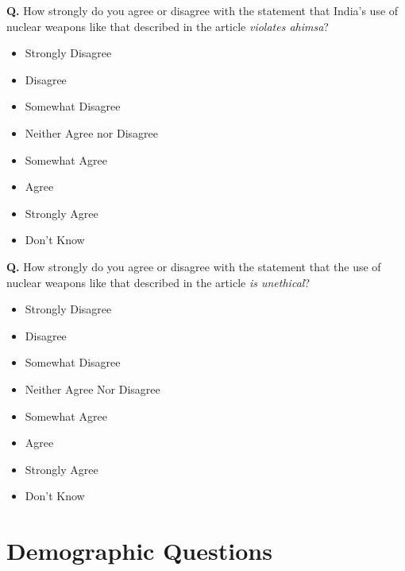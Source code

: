 \documentclass[12pt]{article}
\newcounter{qnum}
\newcommand{\question}[1]{%
  \stepcounter{qnum}%
  \noindent\textbf{Q\thequnum.} #1\par\medskip
}
\newcommand{\likert}[1]{%
  \begin{itemize}[leftmargin=2em, itemsep=2pt, topsep=2pt]
    #1
  \end{itemize}\medskip
}
\begin{document}
\question{How strongly do you agree or disagree with the statement that India's use of nuclear weapons like that described in the article \textit{violates ahimsa}?}
\likert{
  \item Strongly Disagree
  \item Disagree
  \item Somewhat Disagree
  \item Neither Agree nor Disagree
  \item Somewhat Agree
  \item Agree
  \item Strongly Agree
  \item Don't Know
}

\question{How strongly do you agree or disagree with the statement that the use of nuclear weapons like that described in the article \textit{is unethical}?}
\likert{
  \item Strongly Disagree
  \item Disagree
  \item Somewhat Disagree
  \item Neither Agree Nor Disagree
  \item Somewhat Agree
  \item Agree
  \item Strongly Agree
  \item Don't Know
}

\section{Demographic Questions}
\end{document}
